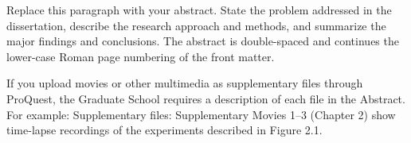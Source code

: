 
Replace this paragraph with your abstract. State the problem addressed in the dissertation, describe the research approach and methods, and summarize the major findings and conclusions. The abstract is double-spaced and continues the lower-case Roman page numbering of the front matter.

If you upload movies or other multimedia as supplementary files through ProQuest, the Graduate School requires a description of each file in the Abstract. For example: Supplementary files: Supplementary Movies 1--3 (Chapter 2) show time-lapse recordings of the experiments described in Figure 2.1.
